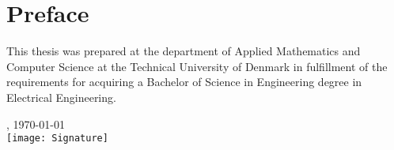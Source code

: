 \chapter{Preface}
This thesis was prepared at the department of Applied Mathematics and Computer Science at the Technical University of Denmark in fulfillment of the requirements for acquiring a Bachelor of Science in Engineering degree in Electrical Engineering.

\vfill

{
\centering
    \thesislocation{}, \today\\[1cm]
    \hspace{3cm}\texttt{[image: Signature]}\\[1cm]
\begin{flushright}
    \thesisauthor{}
\end{flushright}
}